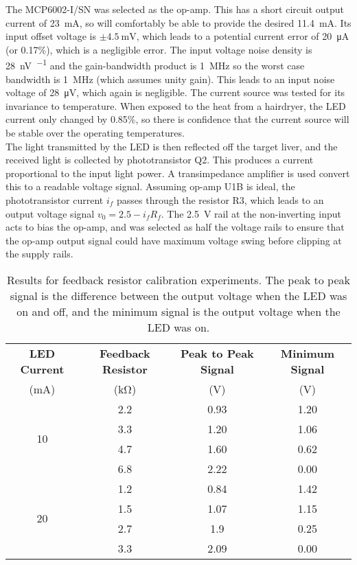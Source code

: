 The MCP6002-I/SN \cite{mcp6002} was selected as the op-amp. This has a short circuit output current of \SI{23}{\milli\ampere}, so will comfortably be able to provide the desired \SI{11.4}{\milli\ampere}. Its input offset voltage is $\pm\SI{4.5}{\milli\volt}$, which leads to a potential current error of \SI{20}{\micro\ampere} (or 0.17\%), which is a negligible error. The input voltage noise density is \SI{28}{\nano\volt\per\sqrt{\hertz}} and the gain-bandwidth product is \SI{1}{\mega\hertz} so the worst case bandwidth is \SI{1}{\mega\hertz} (which assumes unity gain). This leads to an input noise voltage of \SI{28}{\micro\volt}, which again is negligible. The current source was tested for its invariance to temperature. When exposed to the heat from a hairdryer, the LED current only changed by 0.85\%, so there is confidence that the current source will be stable over the operating temperatures.\\

The light transmitted by the LED is then reflected off the target liver, and the received light is collected by phototransistor Q2. This produces a current proportional to the input light power. A transimpedance amplifier is used convert this to a readable voltage signal. Assuming op-amp U1B is ideal, the phototransistor current $i_f$ passes through the resistor R3, which leads to an output voltage signal $v_0 = 2.5 - i_f R_f$. The \SI{2.5}{\volt} rail at the non-inverting input acts to bias the op-amp, and was selected as half the voltage rails to ensure that the op-amp output signal could have maximum voltage swing before clipping at the supply rails.\\

\begin{table}[htbp]
	\centering
	\caption{Results for feedback resistor calibration experiments. The peak to peak signal is the difference between the output voltage when the LED was on and off, and the minimum signal is the output voltage when the LED was on.}
	\label{tab: tia feedback resistor}
	\begin{tabular}{|c|c|c|c|}
		\hline
		\textbf{LED Current} & \textbf{Feedback Resistor} & \textbf{Peak to Peak Signal} & \textbf{Minimum Signal}\\
		(mA)	&	(\si{\kilo\ohm})	&	(V)	&	(V)\\
		\hline
		\multirow{4}{*}{10}	&	2.2	&	0.93	&	1.20\\
						\cline{2-4}
						&	3.3	&	1.20	&	1.06\\
						\cline{2-4}
						&	4.7	&	1.60	&	0.62\\
						\cline{2-4}
						&	6.8	&	2.22	&	0.00\\
		\hline
		\multirow{4}{*}{20}	&	1.2	&	0.84	&	1.42\\
						\cline{2-4}
						&	1.5	&	1.07	&	1.15\\
						\cline{2-4}
						&	2.7	&	1.9	&	0.25\\
						\cline{2-4}
						&	3.3	&	2.09	&	0.00\\
		\hline
	\end{tabular}
\end{table}

